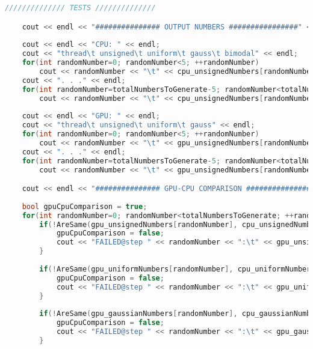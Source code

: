 \begin{lstlisting}[language=C++, caption={\texttt{libraries/CoreLibraries/RandomGenerator/OutputTest.cu}}]
	////////////// TESTS //////////////

	cout << endl << "############### OUTPUT NUMBERS ################" << endl;
	
	cout << endl << "CPU: " << endl;
	cout << "thread\t unsigned\t uniform\t gauss\t bimodal" << endl;
	for(int randomNumber=0; randomNumber<5; ++randomNumber)
		cout << randomNumber << "\t" << cpu_unsignedNumbers[randomNumber] << "\t" << cpu_uniformNumbers[randomNumber] << "\t" << cpu_gaussianNumbers[randomNumber] << "\t" << cpu_bimodalNumbers[randomNumber] << endl;;
	cout << ". . ." << endl;	
	for(int randomNumber=totalNumbersToGenerate-5; randomNumber<totalNumbersToGenerate; ++randomNumber)
		cout << randomNumber << "\t" << cpu_unsignedNumbers[randomNumber] << "\t" << cpu_uniformNumbers[randomNumber] << "\t" << cpu_gaussianNumbers[randomNumber] << "\t" << cpu_bimodalNumbers[randomNumber] << endl;
		
	cout << endl << "GPU: " << endl;
	cout << "thread\t unsigned\t uniform\t gauss" << endl;
	for(int randomNumber=0; randomNumber<5; ++randomNumber)
		cout << randomNumber << "\t" << gpu_unsignedNumbers[randomNumber] << "\t" << gpu_uniformNumbers[randomNumber] << "\t" << gpu_gaussianNumbers[randomNumber] << "\t" << gpu_bimodalNumbers[randomNumber] << endl;
	cout << ". . ." << endl;	
	for(int randomNumber=totalNumbersToGenerate-5; randomNumber<totalNumbersToGenerate; ++randomNumber)
		cout << randomNumber << "\t" << gpu_unsignedNumbers[randomNumber] << "\t" << gpu_uniformNumbers[randomNumber] << "\t" << gpu_gaussianNumbers[randomNumber] << "\t" << gpu_bimodalNumbers[randomNumber] << endl;

	cout << endl << "############### GPU-CPU COMPARISON ################" << endl << endl;
	
	bool gpuCpuComparison = true;
	for(int randomNumber=0; randomNumber<totalNumbersToGenerate; ++randomNumber){
		if(!AreSame(gpu_unsignedNumbers[randomNumber], cpu_unsignedNumbers[randomNumber])){
			gpuCpuComparison = false;
			cout << "FAILED@step " << randomNumber << ":\t" << gpu_unsignedNumbers[randomNumber] << "\t" << cpu_unsignedNumbers[randomNumber] << endl;
		}
		
		if(!AreSame(gpu_uniformNumbers[randomNumber], cpu_uniformNumbers[randomNumber])){
			gpuCpuComparison = false;
			cout << "FAILED@step " << randomNumber << ":\t" << gpu_uniformNumbers[randomNumber] << "\t" << cpu_uniformNumbers[randomNumber] << endl;
		}
		
		if(!AreSame(gpu_gaussianNumbers[randomNumber], cpu_gaussianNumbers[randomNumber])){
			gpuCpuComparison = false;
			cout << "FAILED@step " << randomNumber << ":\t" << gpu_gaussianNumbers[randomNumber] << "\t" << cpu_gaussianNumbers[randomNumber] << endl;
		}
		

\end{lstlisting}
